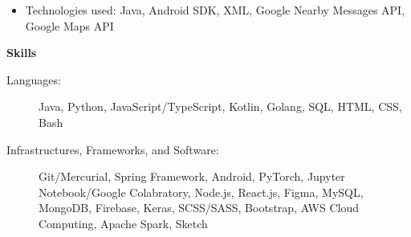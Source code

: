 \documentclass[letterpaper,10pt]{article}
\makeatletter
\newcommand{\resitem}[1]{\item #1 \vspace{-3.5pt}}  %
\newcommand{\resheading}[1]{{\large \colorbox{mygrey}{\begin{minipage}{0.989\textwidth}{\textbf{#1 \vphantom{p\^{E}}}}\end{minipage}}}}
\newcommand{\ressubheading}[4]{
\begin{tabular*}{7.0in}{l@{\extracolsep{\fill}}r}  
		\textbf{#1} & #2 \\
		\textit{#3} & \textit{#4} \\
\end{tabular*}\vspace{-6pt}}  %
\makeatother
\begin{document}
\begin{itemize}
\begin{itemize}
        \resitem{Technologies used: Java, Android SDK, XML, Google Nearby Messages API, Google Maps API}
    \end{itemize}
\end{itemize}



\resheading{Skills}

\begin{description}
\item[Languages:] Java, Python, JavaScript/TypeScript, Kotlin, Golang, SQL, HTML, CSS, Bash
\item[Infrastructures, Frameworks, and Software:] Git/Mercurial, Spring Framework, Android, PyTorch, Jupyter Notebook/Google Colabratory, Node.js, React.js, Figma, MySQL, MongoDB, Firebase, Keras, SCSS/SASS, Bootstrap, AWS Cloud Computing, Apache Spark, Sketch
\end{description}
\end{document}

